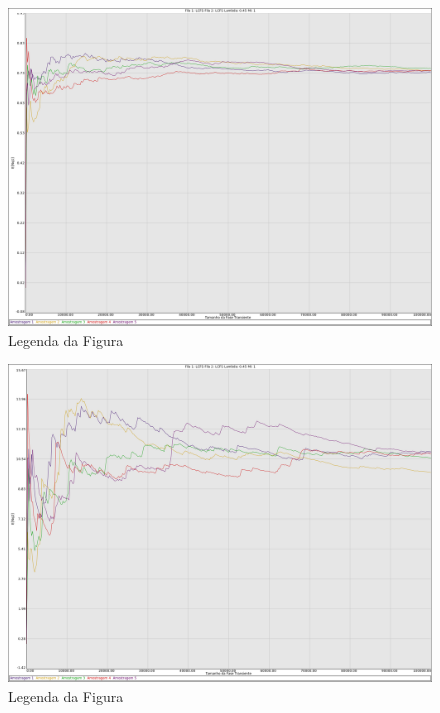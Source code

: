 \documentclass[a4paper,10pt]{article}
\begin{document}
\begin{figure}
	\caption{Legenda da Figura}
	\label{figTransienteLCFSfila1Nq}
	\includegraphics[scale = 0.2]{./graficos_transiente_1/LCFS/03.png}
\end{figure}

\begin{figure}
	\caption{Legenda da Figura}
	\label{figTransienteLCFSfila2Nq}
	\includegraphics[scale = 0.2]{./graficos_transiente_1/LCFS/04.png}
\end{figure}
\end{document}
